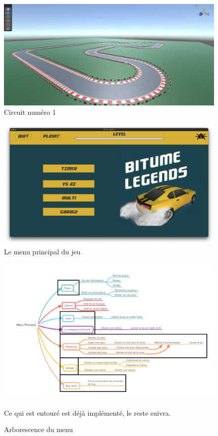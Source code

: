 \documentclass[12pt,a4paper]{article}
\begin{document}
\begin{figure}[h]
    \centering
    \includegraphics[width=15cm]{circuit.png}
    \caption{Circuit numéro 1}
    \label{fig:track}
\end{figure}

\begin{figure}[h]
    \includegraphics[width=15cm]{menu.png}
    \caption{Le menu principal du jeu}
    \label{fig:menu}
    \centering
\end{figure}

\begin{figure}[h]
    \centering
    \includegraphics[width=20cm, angle=90]{Menu_Principal.png}
    \caption{Arborescence du menu}
    \label{fig:mindmap}
    Ce qui est entouré est déjà implémenté, le reste suivra.
\end{figure}
\end{document}
